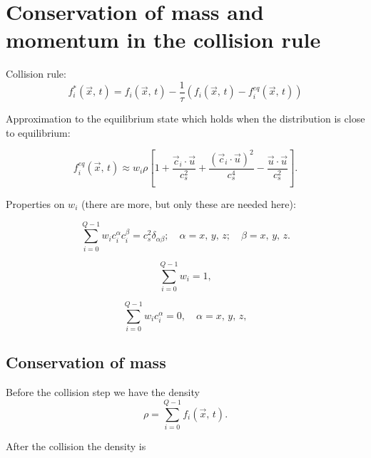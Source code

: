 

\section{Conservation of mass and momentum in the collision rule}



Collision rule:
\begin{equation}
    f_i^*(\vec{x}, \, t) = f_i(\vec{x}, \, t) - \frac{1}{\tau}(f_i(\vec{x},\, t) - f_i^{eq}(\vec{x}, \, t))
\label{collision}
\end{equation}


Approximation to the equilibrium state which holds when the distribution is close to equilibrium:

\begin{equation}
    f_i^{eq}(\vec{x}, \, t) \approx w_i\rho 
    \left[ 1 + 
    \frac{ \vec{c}_i \cdot \vec{u} }{c_s^2} + 
    \frac{(\vec{c}_i \cdot \vec{u})^2}{c_s^4} -
    \frac{\vec{u}\cdot\vec{u}}{c_s^2}
    \right].
\label{approx}
\end{equation}

Properties on $w_i$ (there are more, but only these are needed here):

\begin{equation}
    \sum_{i=0}^{Q-1} w_i  c_i^\alpha  c_i^\beta = c_s^2\delta_{\alpha\beta};
     \quad  \alpha = x,\, y, \, z; \quad \beta= x,\, y, \, z.
\label{prop1}
\end{equation}

\begin{equation}
    \sum_{i=0}^{Q-1} w_i = 1,
\label{prop2}
\end{equation}

\begin{equation}
    \sum_{i=0}^{Q-1} w_i  c_i^\alpha = 0, \quad  \alpha = x,\, y, \, z,
\label{prop3}
\end{equation}


\subsection{Conservation of mass}

Before the collision step we have the density
\begin{equation}
\rho = \sum_{i=0}^{Q-1} f_i(\vec{x}, \, t) .
\end{equation}

After the collision the density is

